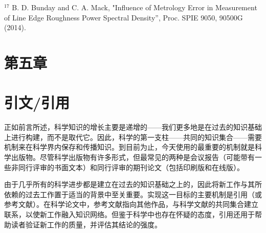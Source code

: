 ${ }^{17}$ B. D. Bunday and C. A. Mack, "Influence of Metrology Error in Measurement of Line Edge Roughness Power Spectral Density”, Proc. SPIE 9050, 90500G (2014).

\section*{第五章}
\section*{引文/引用}
正如前言所述，科学知识的增长主要是递增的——我们更多地是在过去的知识基础上进行构建，而不是取代它。因此，科学的第一支柱——共同的知识集合——需要机制来在科学界内保存和传播知识。到目前为止，今天使用的最重要的机制就是科学出版物。尽管科学出版物有许多形式，但最常见的两种是会议报告（可能带有一些非同行评审的书面文本）和同行评审的期刊论文（包括印刷版和在线版）。

由于几乎所有的科学进步都是建立在过去的知识基础之上的，因此将新工作与其所依赖的过去工作置于适当的背景中至关重要。实现这一目标的主要机制是引用（或参考文献）。在科学论文中，参考文献指向其他作品，与科学文献的共同集合建立联系，以使新工作融入知识网络。但鉴于科学中也存在怀疑的态度，引用还用于帮助读者验证新工作的质量，并评估其结论的强度。

